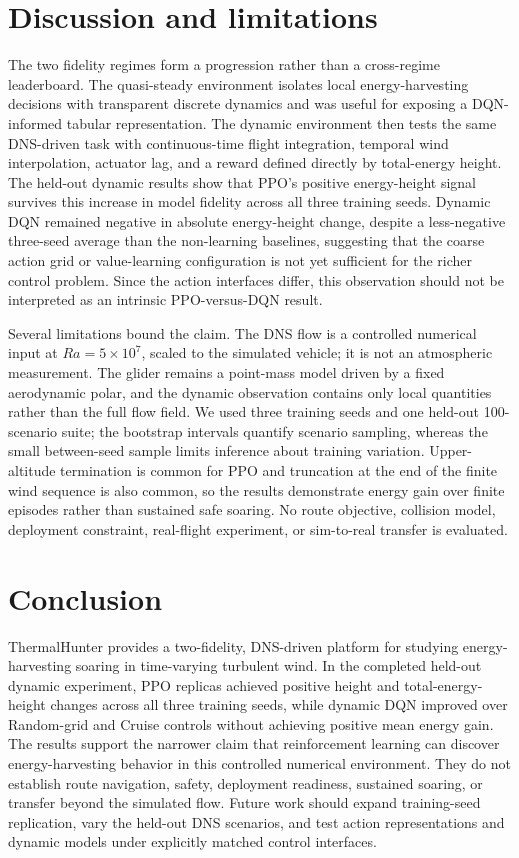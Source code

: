 \documentclass{article}
\begin{document}
\section{Discussion and limitations}
\label{sec:discussion}

The two fidelity regimes form a progression rather than a cross-regime
leaderboard.  The quasi-steady environment isolates local energy-harvesting
decisions with transparent discrete dynamics and was useful for exposing a
DQN-informed tabular representation.  The dynamic environment then tests the
same DNS-driven task with continuous-time flight integration, temporal wind
interpolation, actuator lag, and a reward defined directly by total-energy
height.  The held-out dynamic results show that PPO's positive energy-height
signal survives this increase in model fidelity across all three training
seeds.  Dynamic DQN remained negative in absolute energy-height change, despite
a less-negative three-seed average than the non-learning baselines, suggesting
that the coarse action grid or value-learning configuration is not yet
sufficient for the richer control problem.  Since the action interfaces differ,
this observation should
not be interpreted as an intrinsic PPO-versus-DQN result.

Several limitations bound the claim.  The DNS flow is a controlled numerical
input at $Ra=5\times10^7$, scaled to the simulated vehicle; it is not an
atmospheric measurement.  The glider remains a point-mass model driven by a
fixed aerodynamic polar, and the dynamic observation contains only local
quantities rather than the full flow field.  We used three training seeds and
one held-out 100-scenario suite; the bootstrap intervals quantify scenario
sampling, whereas the small between-seed sample limits inference about training
variation.  Upper-altitude termination is common for PPO and truncation at the
end of the finite wind sequence is also common, so the results demonstrate
energy gain over finite episodes rather than sustained safe soaring.  No route
objective, collision model, deployment constraint, real-flight experiment, or
sim-to-real transfer is evaluated.

\section{Conclusion}
\label{sec:conclusion}

ThermalHunter provides a two-fidelity, DNS-driven platform for studying
energy-harvesting soaring in time-varying turbulent wind.  In the completed
held-out dynamic experiment, PPO replicas achieved positive height and
total-energy-height changes across all three training seeds, while dynamic DQN
improved over Random-grid and Cruise controls without achieving positive mean
energy gain.  The results support the narrower claim that reinforcement
learning can discover energy-harvesting behavior in this controlled numerical
environment.  They do not establish route navigation, safety, deployment
readiness, sustained soaring, or transfer beyond the simulated flow.  Future
work should expand training-seed replication, vary the held-out DNS scenarios,
and test action representations and dynamic models under explicitly matched
control interfaces.
\end{document}
